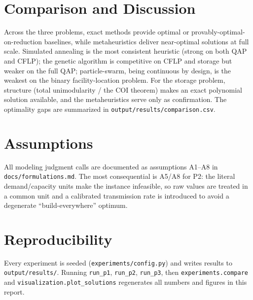 \documentclass[11pt]{article}
\begin{document}
\section{Comparison and Discussion}
Across the three problems, exact methods provide optimal or
provably-optimal-on-reduction baselines, while metaheuristics deliver
near-optimal solutions at full scale. Simulated annealing is the most consistent
heuristic (strong on both QAP and CFLP); the genetic algorithm is competitive on
CFLP and storage but weaker on the full QAP; particle-swarm, being continuous by
design, is the weakest on the binary facility-location problem. For the storage
problem, structure (total unimodularity / the COI theorem) makes an exact
polynomial solution available, and the metaheuristics serve only as confirmation.
The optimality gaps are summarized in \texttt{output/results/comparison.csv}.

\section{Assumptions}
\label{sec:assumptions}
All modeling judgment calls are documented as assumptions A1--A8 in
\texttt{docs/formulations.md}. The most consequential is A5/A8 for P2: the literal
demand/capacity units make the instance infeasible, so raw values are treated in a
common unit and a calibrated transmission rate is introduced to avoid a degenerate
``build-everywhere'' optimum.

\section{Reproducibility}
Every experiment is seeded (\texttt{experiments/config.py}) and writes results to
\texttt{output/results/}. Running \texttt{run\_p1}, \texttt{run\_p2},
\texttt{run\_p3}, then \texttt{experiments.compare} and
\texttt{visualization.plot\_solutions} regenerates all numbers and figures in this
report.



\end{document}
